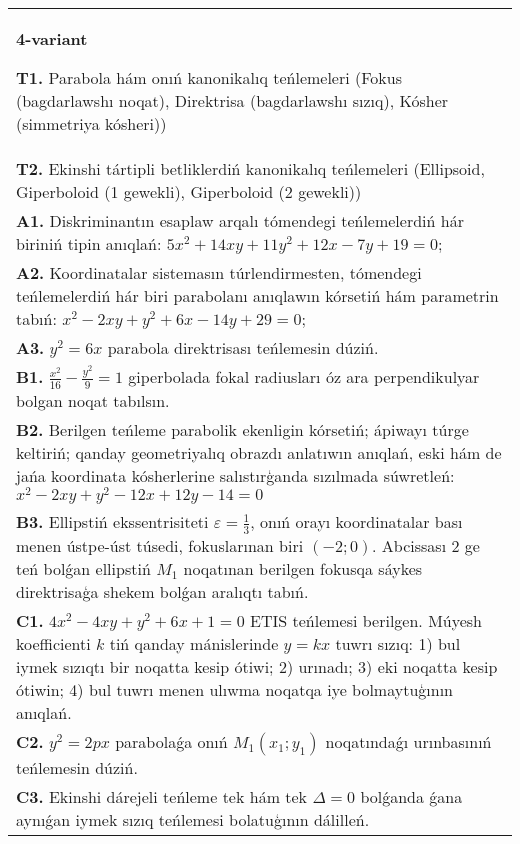 \documentclass{article}
\begin{document}
\begin{tabular}{m{17cm}}
\textbf{4-variant}
\newline

\textbf{T1.} Parabola hám onıń kanonikalıq teńlemeleri (Fokus (bagdarlawshı noqat), Direktrisa (bagdarlawshı sızıq), Kósher (simmetriya kósheri)) \\
\textbf{T2.} Ekinshi tártipli betliklerdiń kanonikalıq teńlemeleri (Ellipsoid, Giperboloid (1 gewekli), Giperboloid (2 gewekli)) \\
\textbf{A1.} Diskriminantın esaplaw arqalı tómendegi teńlemelerdiń hár biriniń tipin anıqlań: $5 x^2+14 x y+11 y^2+12 x-7 y+19=0$; \\
\textbf{A2.} Koordinatalar sistemasın túrlendirmesten, tómendegi teńlemelerdiń hár biri parabolanı anıqlawın kórsetiń hám parametrin tabıń: $x^2-2 x y+y^2+6 x-14 y+29=0$; \\
\textbf{A3.} $y^2=6 x$ parabola direktrisası teńlemesin dúziń. \\
\textbf{B1.} $\frac{x^2}{16}-\frac{y^2}{9}=1$ giperbolada fokal radiusları óz ara perpendikulyar bolgan noqat tabılsın. \\
\textbf{B2.} Berilgen teńleme parabolik ekenligin kórsetiń; ápiwayı túrge keltiriń; qanday geometriyalıq obrazdı anlatıwın anıqlań, eski hám de jańa koordinata kósherlerine salıstırģanda sızılmada súwretleń: $x^2-2 x y+y^2-12 x+12 y-14=0$ \\
\textbf{B3.} Ellipstiń ekssentrisiteti $\varepsilon=\frac{1}{3}$, onıń orayı koordinatalar bası menen ústpe-úst túsedi, fokuslarınan biri $ (-2; 0) $. Abcissası 2 ge teń bolǵan ellipstiń $M_1$ noqatınan berilgen fokusqa sáykes direktrisaģa shekem bolǵan aralıqtı tabıń. \\
\textbf{C1.} $4 x^2-4 x y+y^2+6 x+1=0$ ETIS teńlemesi berilgen. Múyesh koefficienti $k$ tiń qanday mánislerinde $y=kx$ tuwrı sızıq: 1) bul iymek sızıqtı bir noqatta kesip ótiwi; 2) urınadı; 3) eki noqatta kesip ótiwin; 4) bul tuwrı menen ulıwma noqatqa iye bolmaytuģının anıqlań. \\
\textbf{C2.} $y^2=2 p x$ parabolaǵa onıń $M_1\left(x_1; y_1\right) $ noqatındaǵı urınbasınıń teńlemesin dúziń. \\
\textbf{C3.} Ekinshi dárejeli teńleme tek hám tek $\Delta=0$ bolǵanda ǵana aynıǵan iymek sızıq teńlemesi bolatuģının dálilleń. \\

\end{tabular}
\vspace{1cm}
\end{document}
